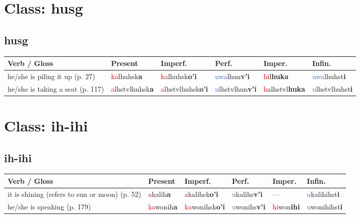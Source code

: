 \documentclass[oneside,openany]{book}%
\begin{document}
\section*{Class: husg}%
%
\needspace{1in}%
\subsection*{husg}%
\begin{tabularx}{\textwidth}{>{\hsize=1.5\hsize\RaggedRight}X >{\hsize=0.9\hsize}X >{\hsize=0.9\hsize}X >{\hsize=0.9\hsize}X >{\hsize=0.9\hsize}X >{\hsize=0.9\hsize}X}%
\toprule%
\textbf{Verb / Gloss}&\textbf{Present}&\textbf{Imperf.}&\textbf{Perf.}&\textbf{Imper.}&\textbf{Infin.}\\%
\midrule%
he/she is piling it up (p. 27)&\textcolor{Red}{ka}lhuhsk\textbf{a}&\textcolor{Red}{ka}lhuhsk\textbf{o'i}&\textcolor{RoyalBlue}{uwa}lhun\textbf{v'i}&\textcolor{Red}{hi}l\textbf{huka}&\textcolor{RoyalBlue}{uwa}lhuhst\textbf{i}\\%
he/she is taking a seat (p. 117)&\textcolor{Red}{a}lhstvlhuhsk\textbf{a}&\textcolor{Red}{a}lhstvlhuhsk\textbf{o'i}&\textcolor{RoyalBlue}{u}lhstvlhun\textbf{v'i}&\textcolor{Red}{h}alhstvl\textbf{huka}&\textcolor{RoyalBlue}{u}lhstvlhuhst\textbf{i}\\%
\bottomrule%
\end{tabularx}%
\vspace{1em}%
\needspace{3in}%
\section*{Class: ih-ihi}%
%
\needspace{1in}%
\subsection*{ih-ihi}%
\begin{tabularx}{\textwidth}{>{\hsize=1.5\hsize\RaggedRight}X >{\hsize=0.9\hsize}X >{\hsize=0.9\hsize}X >{\hsize=0.9\hsize}X >{\hsize=0.9\hsize}X >{\hsize=0.9\hsize}X}%
\toprule%
\textbf{Verb / Gloss}&\textbf{Present}&\textbf{Imperf.}&\textbf{Perf.}&\textbf{Imper.}&\textbf{Infin.}\\%
\midrule%
it is shining (refers to sun or moon) (p. 52)&\textcolor{Red}{a}kalih\textbf{a}&\textcolor{Red}{a}kalihsk\textbf{o'i}&\textcolor{RoyalBlue}{u}kalihs\textbf{v'i}&---&\textcolor{RoyalBlue}{u}kalihihst\textbf{i}\\%
he/she is speaking (p. 179)&\textcolor{Red}{ka}wonih\textbf{a}&\textcolor{Red}{ka}wonihsk\textbf{o'i}&\textcolor{RoyalBlue}{u}wonihs\textbf{v'i}&\textcolor{Red}{hi}won\textbf{ihi}&\textcolor{RoyalBlue}{u}wonihihst\textbf{i}\\%
\bottomrule%
\end{tabularx}%
\vspace{1em}%
\end{document}
